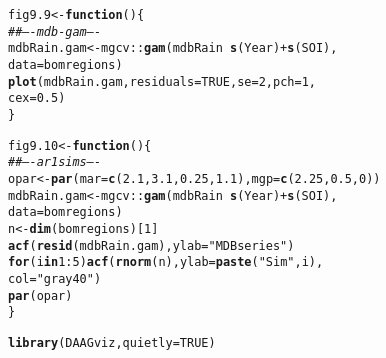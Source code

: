 \documentclass[12pt, a4paper,  BCOR=8.25mm, DIV=15]{scrartcl}\usepackage[]{graphicx}\usepackage[]{color}
\makeatletter
\newcommand{\hlnum}[1]{\textcolor[rgb]{0.686,0.059,0.569}{#1}}%
\newcommand{\hlstr}[1]{\textcolor[rgb]{0.192,0.494,0.8}{#1}}%
\newcommand{\hlcom}[1]{\textcolor[rgb]{0.678,0.584,0.686}{\textit{#1}}}%
\newcommand{\hlopt}[1]{\textcolor[rgb]{0,0,0}{#1}}%
\newcommand{\hlstd}[1]{\textcolor[rgb]{0.345,0.345,0.345}{#1}}%
\newcommand{\hlkwa}[1]{\textcolor[rgb]{0.161,0.373,0.58}{\textbf{#1}}}%
\newcommand{\hlkwb}[1]{\textcolor[rgb]{0.69,0.353,0.396}{#1}}%
\newcommand{\hlkwc}[1]{\textcolor[rgb]{0.333,0.667,0.333}{#1}}%
\newcommand{\hlkwd}[1]{\textcolor[rgb]{0.737,0.353,0.396}{\textbf{#1}}}%
\newenvironment{kframe}{%
 \def\at@end@of@kframe{}%
 \ifinner\ifhmode%
  \def\at@end@of@kframe{\end{minipage}}%
  \begin{minipage}{\columnwidth}%
 \fi\fi%
 \def\FrameCommand##1{\hskip\@totalleftmargin \hskip-\fboxsep
 \colorbox{shadecolor}{##1}\hskip-\fboxsep
     \hskip-\linewidth \hskip-\@totalleftmargin \hskip\columnwidth}%
 \MakeFramed {\advance\hsize-\width
   \@totalleftmargin\z@ \linewidth\hsize
   \@setminipage}}%
 {\par\unskip\endMakeFramed%
 \at@end@of@kframe}
\newenvironment{knitrout}{}{} %
\makeatother
\begin{document}
\begin{knitrout}
\color{fgcolor}\begin{kframe}
\begin{alltt}
\hlstd{fig9.9} \hlkwb{<-} \hlkwa{function}\hlstd{()\{}
\hlcom{## ---- mdb-gam ----}
\hlstd{mdbRain.gam} \hlkwb{<-} \hlstd{mgcv}\hlopt{::}\hlkwd{gam}\hlstd{(mdbRain} \hlopt{~} \hlkwd{s}\hlstd{(Year)} \hlopt{+} \hlkwd{s}\hlstd{(SOI),}
                   \hlkwc{data}\hlstd{=bomregions)}
\hlkwd{plot}\hlstd{(mdbRain.gam,} \hlkwc{residuals}\hlstd{=}\hlnum{TRUE}\hlstd{,} \hlkwc{se}\hlstd{=}\hlnum{2}\hlstd{,} \hlkwc{pch}\hlstd{=}\hlnum{1}\hlstd{,}
     \hlkwc{cex}\hlstd{=}\hlnum{0.5}\hlstd{)}
\hlstd{\}}
\end{alltt}
\end{kframe}
\end{knitrout}

\begin{knitrout}
\color{fgcolor}\begin{kframe}
\begin{alltt}
\hlstd{fig9.10} \hlkwb{<-} \hlkwa{function}\hlstd{()\{}
\hlcom{## ---- ar1sims ----}
\hlstd{opar} \hlkwb{<-} \hlkwd{par}\hlstd{(}\hlkwc{mar}\hlstd{=}\hlkwd{c}\hlstd{(}\hlnum{2.1}\hlstd{,} \hlnum{3.1}\hlstd{,} \hlnum{0.25}\hlstd{,} \hlnum{1.1}\hlstd{),} \hlkwc{mgp}\hlstd{=}\hlkwd{c}\hlstd{(}\hlnum{2.25}\hlstd{,}\hlnum{0.5}\hlstd{,}\hlnum{0}\hlstd{))}
\hlstd{mdbRain.gam} \hlkwb{<-} \hlstd{mgcv}\hlopt{::}\hlkwd{gam}\hlstd{(mdbRain} \hlopt{~} \hlkwd{s}\hlstd{(Year)} \hlopt{+} \hlkwd{s}\hlstd{(SOI),}
                         \hlkwc{data}\hlstd{=bomregions)}
\hlstd{n} \hlkwb{<-}  \hlkwd{dim}\hlstd{(bomregions)[}\hlnum{1}\hlstd{]}
\hlkwd{acf}\hlstd{(}\hlkwd{resid}\hlstd{(mdbRain.gam),} \hlkwc{ylab}\hlstd{=}\hlstr{"MDB series"}\hlstd{)}
\hlkwa{for}\hlstd{(i} \hlkwa{in} \hlnum{1}\hlopt{:}\hlnum{5}\hlstd{)}\hlkwd{acf}\hlstd{(}\hlkwd{rnorm}\hlstd{(n),} \hlkwc{ylab}\hlstd{=}\hlkwd{paste}\hlstd{(}\hlstr{"Sim"}\hlstd{,i),}
                 \hlkwc{col}\hlstd{=}\hlstr{"gray40"}\hlstd{)}
\hlkwd{par}\hlstd{(opar)}
\hlstd{\}}
\end{alltt}
\end{kframe}
\end{knitrout}

\begin{knitrout}
\color{fgcolor}\begin{kframe}
\begin{alltt}
\hlkwd{library}\hlstd{(DAAGviz,} \hlkwc{quietly} \hlstd{=} \hlnum{TRUE}\hlstd{)}
\end{alltt}
\end{kframe}
\end{knitrout}
\end{document}
